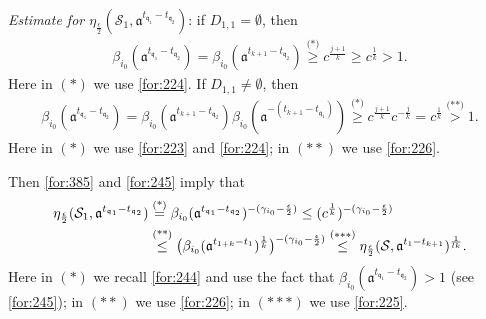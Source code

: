\documentclass[11 pt]{amsart}
\theoremstyle{definition}
\numberwithin{equation}{section}
\begin{document}
\emph{Estimate for $\eta_{\frac{\epsilon}{2}}(\mathcal{S}_1, \mathfrak{a}^{t_{ \mathfrak{q}_1}-t_{ \mathfrak{q}_2}})$}: if $D_{1,1}=\emptyset$, then
\begin{align}\label{for:385}
   \beta_{i_0}(\mathfrak{a}^{t_{ \mathfrak{q}_1}-t_{ \mathfrak{q}_2}})=\beta_{i_0}(\mathfrak{a}^{t_{ k+1}-t_{ \mathfrak{q}_2}})\overset{\text{(*)}}{\geq }c^{\frac{j+1}{k}}\geq c^{\frac{1}{k}}>1.
 \end{align}
 Here in $(*)$ we use \eqref{for:224}. If $D_{1,1}\neq\emptyset$, then
 \begin{align}\label{for:245}
   \beta_{i_0}(\mathfrak{a}^{t_{ \mathfrak{q}_1}-t_{ \mathfrak{q}_2}})=\beta_{i_0}(\mathfrak{a}^{t_{ k+1}-t_{ \mathfrak{q}_2}})\beta_{i_0}(\mathfrak{a}^{-(t_{k+1}-t_{ \mathfrak{q}_1})})\overset{\text{(*)}}{\geq }c^{\frac{j+1}{k}}c^{-\frac{j}{k}}=c^{\frac{1}{k}}\overset{\text{(**)}}{> } 1.
 \end{align}
 Here in $(*)$ we use \eqref{for:223} and \eqref{for:224}; in $(**)$ we use \eqref{for:226}.

Then  \eqref{for:385} and \eqref{for:245} imply that
 \begin{align}\label{for:141}
  \eta_{\frac{\epsilon}{2}}(\mathcal{S}_1, \mathfrak{a}^{t_{ \mathfrak{q}_1}-t_{ \mathfrak{q}_2}})&\overset{\text{(*)}}{=}\beta_{i_0}(\mathfrak{a}^{t_{ \mathfrak{q}_1}-t_{ \mathfrak{q}_2}})^{-(\gamma_{i_0}-\frac{\epsilon}{2})}\leq (c^{\frac{1}{k}})^{-(\gamma_{i_0}-\frac{\epsilon}{2})}\notag\\
  &\overset{\text{(**)}}{\leq}  \big(\beta_{i_0}(\mathfrak{a}^{t_{1+k}-t_{1}})^{\frac{1}{k}}\big)^{-(\gamma_{i_0}-\frac{\epsilon}{2})}
  \overset{(***)}{\leq}  \eta_{\frac{\epsilon}{2}} (\mathcal{S}, \mathfrak{a}^{t_1-t_{k+1}})^{\frac{1}{lk}}.
 \end{align}
Here in $(*)$ we recall \eqref{for:244} and use the fact that $\beta_{i_0}(\mathfrak{a}^{t_{ \mathfrak{q}_1}-t_{ \mathfrak{q}_2}})>1$ (see \eqref{for:245}); in
$(**)$ we use \eqref{for:226};  in $(***)$ we use \eqref{for:225}.
\end{document}
